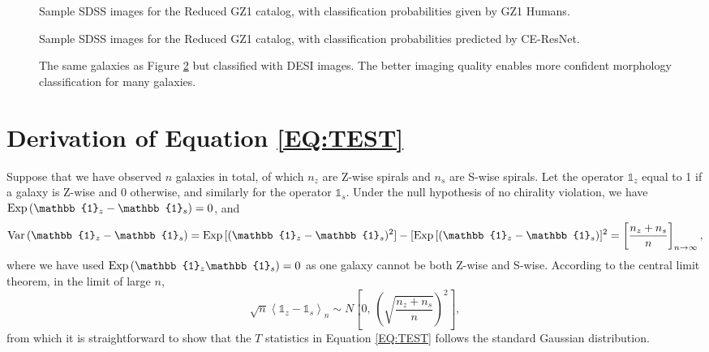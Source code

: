 \documentclass[twocolumn]{aastex631}
\begin{document}
\begin{figure}
    \caption{Sample SDSS images for the Reduced GZ1 catalog, with classification probabilities given by GZ1 Humans.}
    \label{fig:sam-gz-sdss}
\end{figure}

\begin{figure}
    \caption{Sample SDSS images for the Reduced GZ1 catalog, with classification probabilities predicted by CE-ResNet.}
    \label{fig:sam-cnn-sdss}
\end{figure}

\begin{figure}
    \caption{The same galaxies as Figure \ref{fig:sam-cnn-sdss} but classified with DESI images.
    The better imaging quality enables more confident morphology classification for many galaxies.}
    \label{fig:sam-cnn-desi}
\end{figure}

\section{Derivation of Equation \ref{EQ:TEST}}

\label{sec:test}

Suppose that we have observed $n$ galaxies in total, of which $n_z$ are Z-wise spirals and $n_s$ are S-wise spirals.
Let the operator $\mathbb{1}_z$ equal to 1 if a galaxy is Z-wise and 0 otherwise, and similarly for the operator $\mathbb{1}_s$.
Under the null hypothesis of no chirality violation, we have ${\rm Exp}\,(\mathbb{1}_z-\mathbb{1}_s)=0$, and
\begin{equation}
    {\rm Var}\,(\mathbb{1}_z-\mathbb{1}_s)={\rm Exp}\,[(\mathbb{1}_z-\mathbb{1}_s)^2]-[{\rm Exp}\,[(\mathbb{1}_z-\mathbb{1}_s)]^2=\left[ \frac{n_z+n_s}{n} \right]_{n\to\infty},
\end{equation}
where we have used ${\rm Exp}\,(\mathbb{1}_z\mathbb{1}_s)=0$ as one galaxy cannot be both Z-wise and S-wise.
According to the central limit theorem, in the limit of large $n$,
\begin{equation}
    \sqrt{n} \left<\mathbb{1}_z-\mathbb{1}_s\right>_n \sim N\left[0,\,\left(\sqrt{\frac{n_z+n_s}{n}}\right)^2\right],
\end{equation}
from which it is straightforward to show that the $T$ statistics in Equation \ref{EQ:TEST} follows the standard Gaussian distribution.
\end{document}
